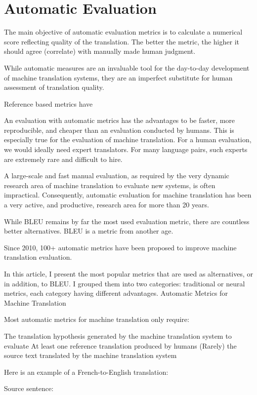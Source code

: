 \section{Automatic Evaluation}
The main objective of automatic evaluation metrics is to calculate a numerical 
score reflecting quality of the translation. The better the metric, the higher it
should agree (correlate) with manually made human judgment. 

While automatic measures are an invaluable tool for the day-to-day development of machine translation systems, they are an imperfect substitute for human assessment of translation quality. 

Reference based metrics have 


An evaluation with automatic metrics has the advantages to be faster, more reproducible, and cheaper than an evaluation conducted by humans. This is especially true for the evaluation of machine translation. For a human evaluation, we would ideally need expert translators. For many language pairs, such experts are extremely rare and difficult to hire.

A large-scale and fast manual evaluation, as required by the very dynamic research area of machine translation to evaluate new systems, is often impractical. Consequently, automatic evaluation for machine translation has been a very active, and productive, research area for more than 20 years.

While BLEU remains by far the most used evaluation metric, there are countless better alternatives. BLEU is a metric from another age.

Since 2010, 100+ automatic metrics have been proposed to improve machine translation evaluation.

In this article, I present the most popular metrics that are used as alternatives, or in addition, to BLEU. I grouped them into two categories: traditional or neural metrics, each category having different advantages.
Automatic Metrics for Machine Translation

Most automatic metrics for machine translation only require:

    The translation hypothesis generated by the machine translation system to evaluate
    At least one reference translation produced by humans
    (Rarely) the source text translated by the machine translation system

Here is an example of a French-to-English translation:

    Source sentence:

